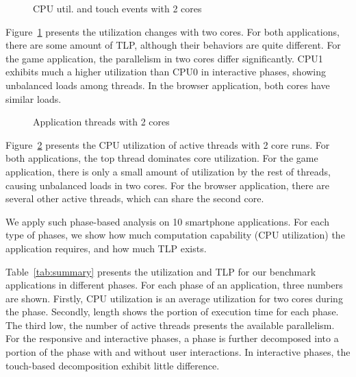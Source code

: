 \begin{figure}[bt]
\begin{center}
\end{center}
\caption{CPU util. and touch events with 2 cores}
\label{fig:interact_util_2cpu}
\end{figure}

Figure~\ref{fig:interact_util_2cpu} presents the utilization changes with two cores.
For both applications, there are some amount of TLP, although their behaviors are 
quite different. For the game application, the parallelism in two cores differ significantly.
CPU1 exhibits much a higher utilization than CPU0 in interactive phases, showing unbalanced
loads among threads. In the browser application, both cores have similar loads.


\begin{figure}[bt]
\begin{center}
\end{center}
\caption{Application threads with 2 cores}
\label{fig:threads}
\end{figure}

Figure~\ref{fig:threads} presents the CPU utilization of active threads with 2 core runs.
For both applications, the top thread dominates core utilization. For the game application,
there is only a small amount of utilization by the rest of threads, causing unbalanced loads
in two cores. For the browser application, there are several other active threads, which
can share the second core.

We apply such phase-based analysis on 10 smartphone applications. For each type of phases,
we show how much computation capability (CPU utilization) the application requires, and how 
much TLP exists.



Table~\ref{tab:summary} presents the utilization and TLP for our benchmark applications in
different phases. For each phase of an application, three numbers are shown. Firstly,
CPU utilization is an average utilization for two cores during the phase. Secondly, 
length shows the portion of execution time for each phase. The third low, the number of
active threads presents the available parallelism. For the responsive and interactive 
phases, a phase is further decomposed into a portion of the phase with and without 
user interactions. In interactive phases, the touch-based decomposition exhibit little difference.

